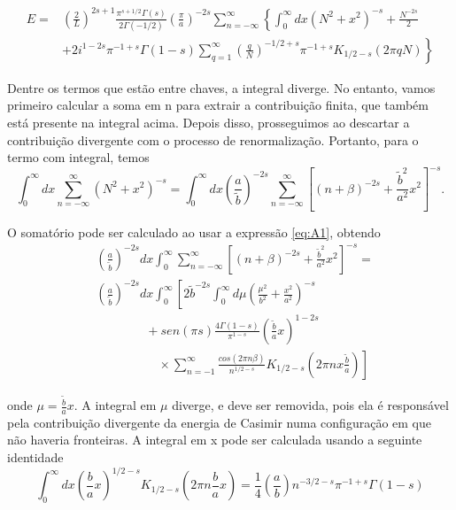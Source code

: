 \begin{equation}
\begin{aligned}
    E =& \left( \frac{2}{L} \right)^{2s+1} \frac{\pi^{s+1/2}\Gamma(s)}{2\Gamma(-1/2)} \left( \frac{\pi}{a} \right)^{-2s} \sum_{n=-\infty}^{\infty} \left\{ \int_{0}^{\infty} dx (N^2 + x^2)^{-s} + \frac{N^{-2s}}{2} \right. \\
     &+ \left. 2i^{1-2s} \pi^{-1+s} \Gamma(1-s) \sum_{q=1}^\infty \left( \frac{q}{N} \right)^{-1/2 + s} \pi^{-1+s} K_{1/2-s}(2\pi qN)  \right\} \label{eq:energyWithK}
\end{aligned}
\end{equation}

Dentre os termos que estão entre chaves, a integral diverge. No entanto, vamos primeiro calcular a soma em n para extrair a contribuição finita, que também está presente na integral acima. Depois disso, prosseguimos ao descartar a contribuição divergente com o processo de renormalização. Portanto, para o termo com integral, temos
\begin{equation}
     \int_{0}^{\infty} dx \sum_{n=-\infty}^{\infty} (N^2 + x^2)^{-s} = \int_0^\infty dx \left( \frac{a}{\tilde{b}} \right)^{-2s} \sum_{n=-\infty}^{\infty} \left[ (n + \beta)^{-2s} + \frac{\tilde{b}^2}{a^2}x^2 \right]^{-s}. \label{eq:abfatorados}
\end{equation}

O somatório pode ser calculado ao usar a expressão \eqref{eq:A1}, obtendo
\begin{equation}
    \begin{aligned}
     & \left( \frac{a}{\tilde{b}} \right)^{-2s} dx \int_0^\infty  \sum_{n=-\infty}^{\infty} \left[ (n + \beta)^{-2s} + \frac{\tilde{b}^2}{a^2}x^2 \right]^{-s} =\\
     & \left( \frac{a}{\tilde{b}} \right)^{-2s} dx  \int_0^\infty \left[ 2\tilde{b}^{-2s} \int_0^\infty d\mu \left( \frac{\mu^2}{b^2} + \frac{x^2}{a^2} \right)^{-s} \right. \\
     & \qquad \qquad +  sen(\pi s) \frac{4\Gamma(1 - s)}{\pi^{1-s}} \left( \frac{\tilde{b}}{a}x \right)^{1-2s} \\ 
     & \qquad \qquad \quad \times \left.  \sum_{n=-1}^\infty \frac{cos(2\pi n \beta)}{n^{1/2-s}} K_{1/2-s} \left( 2\pi nx \frac{\tilde{b}}{a} \right) \right] \label{eq:eqComMu}
    \end{aligned}
\end{equation}

onde $\mu= \frac{\tilde{b}}{a}x$. A integral em $\mu$ diverge, e deve ser removida, pois ela é responsável pela contribuição divergente da energia de Casimir numa configuração em que não haveria fronteiras. A integral em x pode ser calculada usando a seguinte identidade
\begin{equation}
    \int_0^\infty dx \left( \frac{b}{a}x \right)^{1/2-s} K_{1/2 -s} \left( 2\pi n \frac{b}{a} x  \right) = \frac{1}{4} \left( \frac{a}{b}  \right) n ^{-3/2-s} \pi^{-1+s} \Gamma(1-s) \label{eq:semK}
\end{equation}

